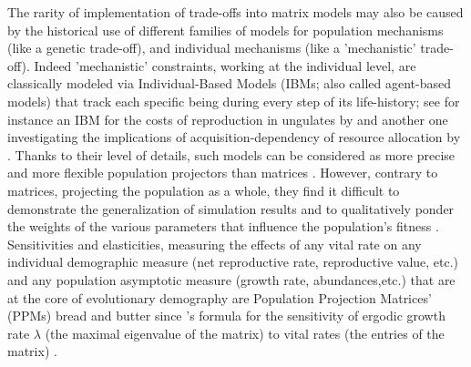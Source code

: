 \documentclass[10pt,a4paper]{article}
\begin{document}
The rarity of implementation of trade-offs into matrix models may also be caused by the historical use of different families of models for population mechanisms (like a genetic trade-off), and individual mechanisms (like a 'mechanistic' trade-off).
Indeed 'mechanistic' constraints, working at the individual level, are classically modeled via Individual-Based Models (IBMs; also called agent-based models) that track each specific being during every step of its life-history; see for instance an IBM for the costs of reproduction in ungulates by \citet{Proaktor2008} and another one investigating the implications of acquisition-dependency of resource allocation by \citep{Descamps2016}. 
Thanks to their level of details, such models can be considered as more precise and more flexible population projectors than matrices \citep{VanImhoff1998}.
However, contrary to matrices, projecting the population as a whole, they find it difficult to demonstrate the generalization of simulation results and to qualitatively ponder the weights of the various parameters that influence the population's fitness \citep{Caswell1992}. 
Sensitivities and elasticities, measuring the effects of any vital rate on any individual demographic measure (net reproductive rate, reproductive value, etc.) and any population asymptotic measure (growth rate, abundances,etc.) that are at the core of evolutionary demography are Population Projection Matrices' (PPMs) bread and butter since \citet{Caswell1978}'s formula for the sensitivity of ergodic growth rate $\lambda$ (the maximal eigenvalue of the matrix) to vital rates (the entries of the matrix) \citep[see further developments by][]{DeKroon1986,Caswell2001,VanTienderen2000}.
\end{document}
